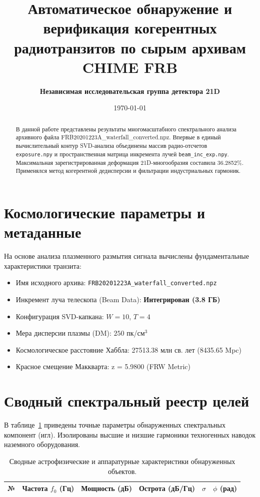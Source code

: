 \documentclass[11pt,twocolumn]{article}
\title{\textbf{Автоматическое обнаружение и верификация когерентных радиотранзитов по сырым архивам CHIME FRB}}
\author{\textbf{Независимая исследовательская группа детектора 21D}}
\date{\today}
\begin{document}
\maketitle
\begin{abstract}
В данной работе представлены результаты многомасштабного спектрального анализа архивного файла FRB20201223A_waterfall_converted.npz. Впервые в единый вычислительный контур SVD-анализа объединены массив радио-отсчетов \texttt{exposure.npy} и пространственная матрица инкремента лучей \texttt{beam\_inc\_exp.npy}. Максимальная зарегистрированная деформация 21D-многообразия составила 36.2852\%. Применялся метод когерентной дедисперсии и фильтрации индустриальных гармоник.
\end{abstract}

\section{Космологические параметры и метаданные}
На основе анализа плазменного размытия сигнала вычислены фундаментальные характеристики транзита:
\begin{itemize}
  \item Имя исходного архива: \texttt{FRB20201223A_waterfall_converted.npz}
  \item Инкремент луча телескопа (Beam Data): \textbf{Интегрирован (3.8 ГБ)}
  \item Конфигурация SVD-капкана: $W = 10$, $T = 4$
  \item Мера дисперсии плазмы (DM): $250$ пк/см$^3$
  \item Космологическое расстояние Хаббла: 27513.38 млн св. лет (8435.65 Mpc)
  \item Красное смещение Маккварта: z = 5.9800 (FRW Metric)
\end{itemize}

\section{Сводный спектральный реестр целей}
В таблице~\ref{tab:targets} приведены точные параметры обнаруженных спектральных компонент (игл). 
Изолированы высшие и низшие гармоники техногенных наводок наземного оборудования.\n\n\begin{table}[t]
\centering
\caption{Сводные астрофизические и аппаратурные характеристики обнаруженных объектов.}
\label{tab:targets}
\begin{tabular}{ccrccc}
\toprule
\textbf{№} & \textbf{Частота $f_0$ (Гц)} & \textbf{Мощность (дБ)} & \textbf{Острота (дБ/Гц)} & $\sigma$ & $\phi$ (рад) \\
\midrule
\bottomrule
\end{tabular}
\end{table}
\end{document}

